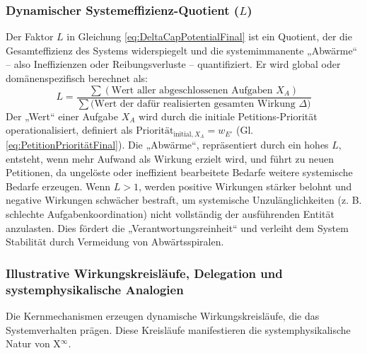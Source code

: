 \documentclass[12pt]{scrartcl}
\begin{document}
\subsubsection{Dynamischer Systemeffizienz-Quotient ($L$)}
\label{sec:LFinal}
Der Faktor $L$ in Gleichung \eqref{eq:DeltaCapPotentialFinal} ist ein Quotient, der die Gesamteffizienz des Systems widerspiegelt und die systemimmanente „Abwärme“ – also Ineffizienzen oder Reibungsverluste – quantifiziert. Er wird global oder domänenspezifisch berechnet als:
\begin{equation}
L = \dfrac{\sum (\text{Wert aller abgeschlossenen Aufgaben } X_A)}{\sum (\text{Wert der dafür realisierten gesamten Wirkung } \Delta\text{)}}
\label{eq:LFinal}
\end{equation}
Der „Wert“ einer Aufgabe $X_A$ wird durch die initiale Petitions-Priorität operationalisiert, definiert als $\text{Priorität}_{\text{initial}, X_A} = w_{E'}$ (Gl. \eqref{eq:PetitionPrioritätFinal}). Die „Abwärme“, repräsentiert durch ein hohes $L$, entsteht, wenn mehr Aufwand als Wirkung erzielt wird, und führt zu neuen Petitionen, da ungelöste oder ineffizient bearbeitete Bedarfe weitere systemische Bedarfe erzeugen. Wenn $L > 1$, werden positive Wirkungen stärker belohnt und negative Wirkungen schwächer bestraft, um systemische Unzulänglichkeiten (z. B. schlechte Aufgabenkoordination) nicht vollständig der ausführenden Entität anzulasten. Dies fördert die „Verantwortungsreinheit“ und verleiht dem System Stabilität durch Vermeidung von Abwärtsspiralen.

\subsubsection{Illustrative Wirkungskreisläufe, Delegation und systemphysikalische Analogien}
\label{sec:Wirkungskreislaeufe}
Die Kernmechanismen erzeugen dynamische Wirkungskreisläufe, die das Systemverhalten prägen. Diese Kreisläufe manifestieren die systemphysikalische Natur von X$^\infty$.
\end{document}
